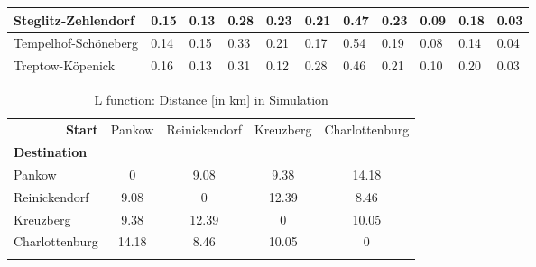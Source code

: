 \begin{sidewaystable}
\begin{tabularx}{\textwidth}{|p{3cm}|*{5}X|*{5}X|}
  Steglitz-Zehlendorf        &           0.15 &        0.13 &        0.28 &        0.23 &          0.21 &             0.47 &  0.23 &           0.09 &                  0.18 &                  0.03 \\\hline
  Tempelhof-Schöneberg       &           0.14 &        0.15 &        0.33 &        0.21 &          0.17 &             0.54 &  0.19 &           0.08 &                  0.14 &                  0.04 \\\hline
  Treptow-Köpenick           &           0.16 &        0.13 &        0.31 &        0.12 &          0.28 &             0.46 &  0.21 &           0.10 &                  0.20 &                  0.03 \\\hline
\end{tabularx}

\end{sidewaystable}

\begin{longtable}{ | l | c  c  c  c |}
  \hline
  \multicolumn{1}{|r|}{\textbf{Start}} & Pankow & Reinickendorf & Kreuzberg & Charlottenburg \\
  \textbf{Destination} & {} & {} & {} & {} \\\hline
  Pankow & 0 & 9.08 & 9.38 & 14.18 \\
  Reinickendorf & 9.08 & 0 & 12.39 & 8.46 \\
  Kreuzberg & 9.38 & 12.39 & 0 & 10.05 \\
  Charlottenburg & 14.18 & 8.46 & 10.05 & 0 \\
  
  \hline

  \caption{L function: Distance [in km] in Simulation}
  \label{table:Distance}
\end{longtable}


